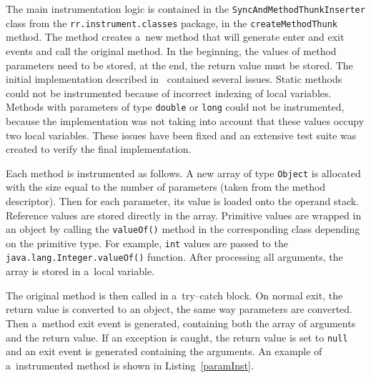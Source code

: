 The main instrumentation logic is contained in the
\texttt{SyncAndMethodThunkInserter} class from the
\texttt{rr.instrument.classes} package, in the \texttt{createMethodThunk}
method. The method creates a~new method that will generate enter and exit events
and call the original method. In the beginning, the values of method parameters
need to be stored, at the end, the return value must be stored. The initial
implementation described in~\cite{janousek} contained several issues. Static
methods could not be instrumented because of incorrect indexing of local
variables. Methods with parameters of type \texttt{double} or \texttt{long}
could not be instrumented, because the implementation was not taking into
account that these values occupy two local variables. These issues have been
fixed and an extensive test suite was created to verify the final
implementation.

Each method is instrumented as follows. A new array of type \texttt{Object} is
allocated with the size equal to the number of parameters (taken from the method
descriptor). Then for each parameter, its value is loaded onto the operand
stack. Reference values are stored directly in the array. Primitive values are
wrapped in an object by calling the \texttt{valueOf()} method in the
corresponding class depending on the primitive type. For example, \texttt{int}
values are passed to the \texttt{java.lang.Integer.valueOf()} function. After
processing all arguments, the array is stored in a~local variable.

The original method is then called in a~try--catch block. On normal exit, the
return value is converted to an object, the same way parameters are converted.
Then a~method exit event is generated, containing both the array of arguments
and the return value. If an exception is caught, the return value is set to
\texttt{null} and an exit event is generated containing the arguments. An
example of a~instrumented method is shown in Listing~\ref{paramInst}.

